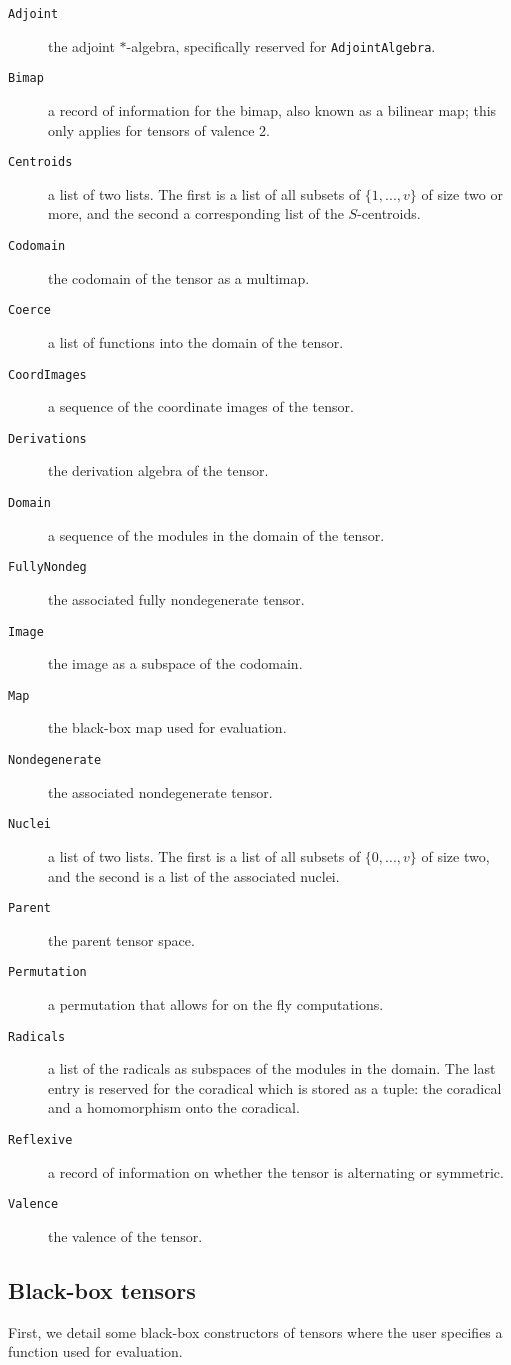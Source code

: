 \documentclass{amsart}
\begin{document}
\begin{description}
\item[{\tt Adjoint}] the adjoint $*$-algebra, specifically reserved for 
{\tt AdjointAlgebra}. 
\item[{\tt Bimap}] a record of information for the bimap, also known as a bilinear map; this only 
applies for tensors of valence 2.
\item[{\tt Centroids}] a list of two lists. The first is a list of all subsets 
of $\{1,...,v\}$ of size two or more, and the second a corresponding list of the
$S$-centroids.
\item[{\tt Codomain}] the codomain of the tensor as a multimap.
\item[{\tt Coerce}] a list of functions into the domain of the tensor. 
\item[{\tt CoordImages}] a sequence of the coordinate images of the tensor.
\item[{\tt Derivations}] the derivation algebra of the tensor.
\item[{\tt Domain}] a sequence of the modules in the domain of the tensor.
\item[{\tt FullyNondeg}] the associated fully nondegenerate tensor.
\item[{\tt Image}] the image as a subspace of the codomain.
\item[{\tt Map}] the black-box map used for evaluation.
\item[{\tt Nondegenerate}] the associated nondegenerate tensor.
\item[{\tt Nuclei}] a list of two lists. The first is a list of all subsets of 
$\{0,...,v\}$ of size two, and the second is a list of the associated nuclei.
\item[{\tt Parent}] the parent tensor space. 
\item[{\tt Permutation}] a permutation that allows for on the fly computations.
\item[{\tt Radicals}] a list of the radicals as subspaces of the modules in the
domain. The last entry is reserved for the coradical which is stored as a tuple:
the coradical and a homomorphism onto the coradical.
\item[{\tt Reflexive}] a record of information on whether the tensor is 
alternating or symmetric.
\item[{\tt Valence}] the valence of the tensor.
\end{description}


\subsection{Black-box tensors}
First, we detail some black-box constructors of tensors where the user specifies 
a function used for evaluation.
\end{document}
